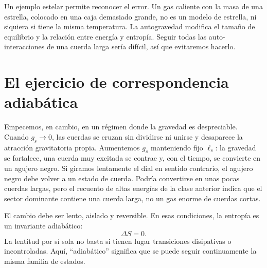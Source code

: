 Un ejemplo estelar permite reconocer el error. Un gas caliente con la masa de una estrella, colocado en una caja demasiado grande, no es un modelo de estrella, ni siquiera si tiene la misma temperatura. La autogravedad modifica el tamaño de equilibrio y la relación entre energía y entropía. Seguir todas las auto-interacciones de una cuerda larga sería difícil, así que evitaremos hacerlo.

\begin{classroomqa}
\end{classroomqa}

\section{El ejercicio de correspondencia adiabática}

Empecemos, en cambio, en un régimen donde la gravedad es despreciable. Cuando \(g_s\to0\), las cuerdas se cruzan sin dividirse ni unirse y desaparece la atracción gravitatoria propia. Aumentemos \(g_s\) manteniendo fijo \(\ell_s\): la gravedad se fortalece, una cuerda muy excitada se contrae y, con el tiempo, se convierte en un agujero negro. Si giramos lentamente el dial en sentido contrario, el agujero negro debe volver a un estado de cuerda. Podría convertirse en unas pocas cuerdas largas, pero el recuento de altas energías de la clase anterior indica que el sector dominante contiene una cuerda larga, no un gas enorme de cuerdas cortas.

\begin{classroomqa}
\end{classroomqa}

El cambio debe ser lento, aislado y reversible. En esas condiciones, la entropía es un invariante adiabático:
\begin{equation}
\Delta S=0.
\label{eq:l07-adiabatic}
\end{equation}
La lentitud por sí sola no basta si tienen lugar transiciones disipativas o incontroladas. Aquí, ``adiabático'' significa que se puede seguir continuamente la misma familia de estados.

